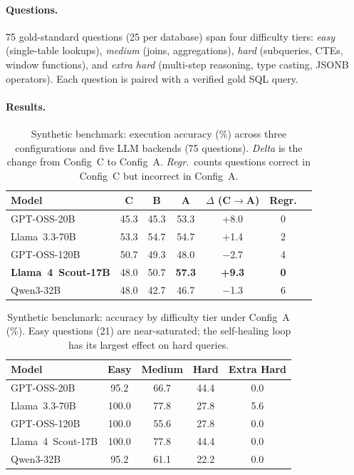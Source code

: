 \documentclass{article}
\begin{document}
\paragraph{Questions.} 75 gold-standard questions (25 per database) span four difficulty tiers: \emph{easy} (single-table lookups), \emph{medium} (joins, aggregations), \emph{hard} (subqueries, CTEs, window functions), and \emph{extra hard} (multi-step reasoning, type casting, JSONB operators). Each question is paired with a verified gold SQL query.

\paragraph{Results.}

\begin{table}[ht]
\centering
\caption{Synthetic benchmark: execution accuracy (\%) across three configurations and five LLM backends (75 questions). \emph{Delta} is the change from Config~C to Config~A. \emph{Regr.}\ counts questions correct in Config~C but incorrect in Config~A.}
\label{tab:synthetic_results}
\small
\begin{tabular}{@{}lcccccc@{}}
\toprule
\textbf{Model} & \textbf{C} & \textbf{B} & \textbf{A} & \textbf{$\Delta$ (C$\to$A)} & \textbf{Regr.} \\
\midrule
GPT-OSS-20B                      & 45.3 & 45.3 & 53.3 & +8.0  & 0 \\
Llama~3.3-70B                    & 53.3 & 54.7 & 54.7 & +1.4  & 2 \\
GPT-OSS-120B                     & 50.7 & 49.3 & 48.0 & $-$2.7 & 4 \\
\textbf{Llama~4~Scout-17B}       & 48.0 & 50.7 & \textbf{57.3} & \textbf{+9.3} & \textbf{0} \\
Qwen3-32B                        & 48.0 & 42.7 & 46.7 & $-$1.3 & 6 \\
\bottomrule
\end{tabular}
\end{table}

\begin{table}[ht]
\centering
\caption{Synthetic benchmark: accuracy by difficulty tier under Config~A (\%). Easy questions (21) are near-saturated; the self-healing loop has its largest effect on hard queries.}
\label{tab:synthetic_difficulty}
\small
\begin{tabular}{@{}lcccc@{}}
\toprule
\textbf{Model} & \textbf{Easy} & \textbf{Medium} & \textbf{Hard} & \textbf{Extra Hard} \\
\midrule
GPT-OSS-20B          & 95.2 & 66.7 & 44.4 & 0.0 \\
Llama~3.3-70B        & 100.0 & 77.8 & 27.8 & 5.6 \\
GPT-OSS-120B         & 100.0 & 55.6 & 27.8 & 0.0 \\
Llama~4~Scout-17B    & 100.0 & 77.8 & 44.4 & 0.0 \\
Qwen3-32B            & 95.2 & 61.1 & 22.2 & 0.0 \\
\bottomrule
\end{tabular}
\end{table}
\end{document}
